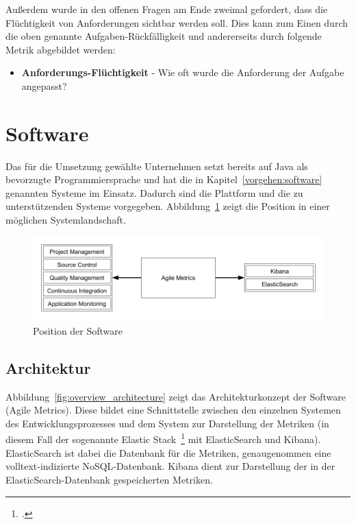 Außerdem wurde in den offenen Fragen am Ende zweimal gefordert, dass die Flüchtigkeit von Anforderungen sichtbar werden soll. 
Dies kann zum Einen durch die oben genannte Aufgaben-Rückfälligkeit und andererseits durch folgende Metrik abgebildet werden:

\begin{itemize}[noitemsep]
    \item \textbf{Anforderungs-Flüchtigkeit} \mbox{-} Wie oft wurde die Anforderung der Aufgabe angepasst?
\end{itemize}

\clearpage
\section{Software}

Das für die Umsetzung gewählte Unternehmen setzt bereits auf Java als bevorzugte Programmiersprache und hat die in Kapitel~\ref{vorgehen:software} genannten Systeme im Einsatz.
Dadurch sind die Plattform und die zu unterstützenden Systeme vorgegeben.
Abbildung~\ref{fig:position_software} zeigt die Position in einer möglichen Systemlandschaft.

\begin{savenotes}
    \begin{figure}[H] 
        \centering
            \includegraphics[width=1.0\textwidth]{img/position-overview.png}
        \caption{Position der Software}\label{fig:position_software}
    \end{figure}
\end{savenotes}

\subsection{Architektur}

Abbildung~\ref{fig:overview_architecture} zeigt das Architekturkonzept der Software (Agile Metrics).
Diese bildet eine Schnittstelle zwischen den einzelnen Systemen des Entwicklungsprozesses und dem System zur Darstellung der Metriken (in diesem Fall der sogenannte Elastic Stack~\footcite{elastic_stack} mit ElasticSearch und Kibana).
ElasticSearch ist dabei die Datenbank für die Metriken, genaugenommen eine volltext-indizierte \ac{NoSQL}-Datenbank.
Kibana dient zur Darstellung der in der ElasticSearch-Datenbank gespeicherten Metriken.

